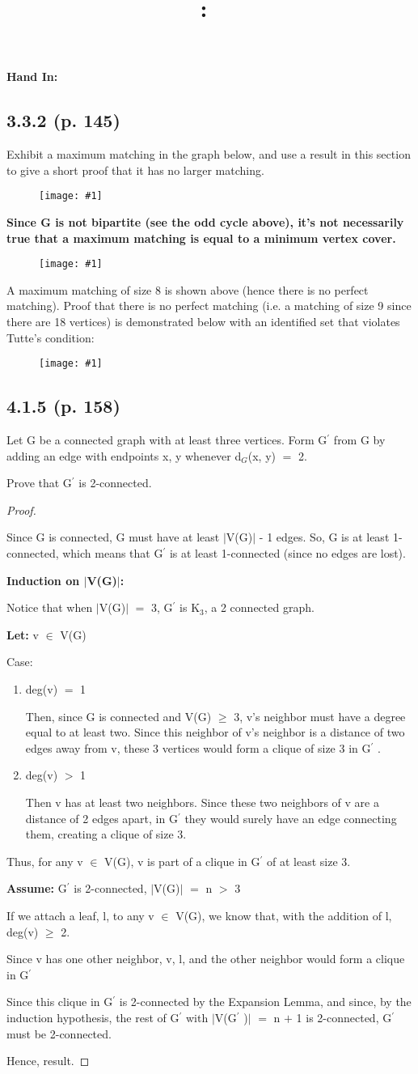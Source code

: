 \documentclass{article}
\title{
    \vspace{2in}
    \textmd{\textbf{\hmwkClass:\ \hmwkTitle}}\\
    \normalsize\vspace{0.1in}\small\vspace{0.1in}\large{\textit{\hmwkClassInstructor}}
    \vspace{3in}
}
\author{\hmwkAuthorName}
\date{}
\newcommand{\mt}[1]{\ensuremath{#1}}
\newcommand\ssc[2][\DefaultOpt]{%
  \def\DefaultOpt{#2}%
  \subsection[#1]{#2}%
}
\newcommand{\bgpf}{\begin{proof} $ $\newline}
\newcommand{\elist}{\end{enumerate}}
\newcommand{\bilist}{\begin{enumerate}[label=\roman*)]}
\newcommand{\lt}[1]{\textbf{Let: } #1}
\newcommand{\as}[1]{\textbf{Assume: } #1}
\newcommand{\epf}{\end{proof}}
\newcommand{\mem}{\mt{\in} }
\newcommand{\av}[1]{\mt{|}#1\mt{|}}  %
\newcommand{\ps}{\mt{\operatorname{+}} }
\newcommand{\ms}{\mt{\operatorname{-}} }
\newcommand{\gr}{\mt{\operatorname{>}} }
\newcommand{\gre}{\mt{\operatorname{\geq}} }
\newcommand{\eql}{ \mt{\operatorname{=}} }
\newcommand{\pr}{\mt{^\prime} } 		   %
\newcommand{\uw}[2]{#1\mt{_{#2}}}
\newcommand{\simg}[1]{
\begin{figure}[h]
  \texttt{[image: \#1]}
\end{figure}
}
\begin{document}
\textbf{Hand In:}

\ssc{3.3.2 (p. 145)}{

Exhibit a maximum matching in the graph below, and use a result in this section to give a short proof that it has no larger matching.

\simg{GTHW53322}

\textbf{Since G is not bipartite (see the odd cycle above), it's not necessarily true that a maximum matching is equal to a minimum vertex cover.}

\simg{GTHW5332}

A maximum matching of size 8 is shown above (hence there is no perfect matching). Proof that there is no perfect matching (i.e. a matching of size 9 since there are 18 vertices) is demonstrated below with an identified set that violates Tutte's condition:

\simg{GTHW53323}

}

\newpage


\ssc{4.1.5 (p. 158)}{

Let G be a connected graph with at least three vertices. Form G\pr from G by adding an edge with endpoints x, y whenever \uw{d}{G}(x, y) \eql 2.

Prove that G\pr is 2-connected.
\bgpf

Since G is connected, G must have at least \av{V(G)} \ms 1 edges. So, G is at least 1-connected, which means that G\pr is at least 1-connected (since no edges are lost).

\textbf{Induction on \av{V(G)}:}

Notice that when \av{V(G)} \eql 3, G\pr is \uw{K}{3}, a 2 connected graph.

\lt{v \mem V(G)}

Case:
\bilist
\item deg(v) \eql 1

Then, since G is connected and V(G) \gre 3, v's neighbor must have a degree equal to at least two. Since this neighbor of v's neighbor is a distance of two edges away from v, these 3 vertices would form a clique of size 3 in G\pr.

\item deg(v) \gr 1

Then v has at least two neighbors. Since these two neighbors of v are a distance of 2 edges apart, in G\pr they would surely have an edge connecting them, creating a clique of size 3.
\elist


Thus, for any v \mem V(G), v is part of a clique in G\pr of at least size 3.

\as{G\pr is 2-connected, \av{V(G)} \eql n \gr 3}

If we attach a leaf, l, to any v \mem V(G), we know that, with the addition of l, deg(v) \gre 2.

Since v has one other neighbor, v, l, and the other neighbor would form a clique in G\pr

Since this clique in G\pr is 2-connected by the Expansion Lemma, and since, by the induction hypothesis, the rest of G\pr with \av{V(G\pr)} \eql n \ps 1 is 2-connected, G\pr must be 2-connected.

Hence, result.

\epf
}
\end{document}
